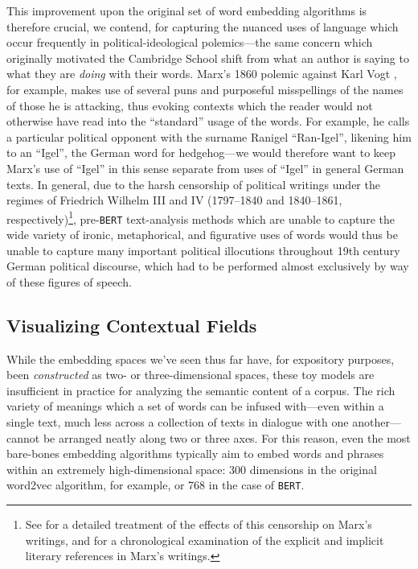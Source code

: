 \documentclass[11pt]{article}
\newcommand{\BERT}[0]{\texttt{BERT}}
\begin{document}
This improvement upon the original set of word embedding algorithms is therefore crucial, we contend, for capturing the nuanced uses of language which occur frequently in political-ideological polemics---the same concern which originally motivated the Cambridge School shift from what an author is saying to what they are \textit{doing} with their words. Marx's 1860 polemic against Karl Vogt \parencite{marx_herr_1860}, for example, makes use of several puns and purposeful misspellings of the names of those he is attacking, thus evoking contexts which the reader would not otherwise have read into the ``standard'' usage of the words. For example, he calls a particular political opponent with the surname Ranigel ``Ran-Igel'', likening him to an ``Igel'', the German word for hedgehog---we would therefore want to keep Marx's use of ``Igel'' in this sense separate from uses of ``Igel'' in general German texts. In general, due to the harsh censorship of political writings under the regimes of Friedrich Wilhelm III and IV (1797--1840 and 1840--1861, respectively)\footnote{See \cite{rose_reading_1978} for a detailed treatment of the effects of this censorship on Marx's writings, and \cite{prawer_karl_1976} for a chronological examination of the explicit and implicit literary references in Marx's writings.}, pre-\BERT{} text-analysis methods which are unable to capture the wide variety of ironic, metaphorical, and figurative uses of words would thus be unable to capture many important political illocutions throughout 19th century German political discourse, which had to be performed almost exclusively by way of these figures of speech.

\subsection{Visualizing Contextual Fields}\label{sec:methods-visualizing}

While the embedding spaces we've seen thus far have, for expository purposes, been \textit{constructed} as two- or three-dimensional spaces, these toy models are insufficient in practice for analyzing the semantic content of a corpus. The rich variety of meanings which a set of words can be infused with---even within a single text, much less across a collection of texts in dialogue with one another---cannot be arranged neatly along two or three axes. For this reason, even the most bare-bones embedding algorithms typically aim to embed words and phrases within an extremely high-dimensional space: 300 dimensions in the original word2vec algorithm, for example, or 768 in the case of \BERT{}. 
\end{document}
